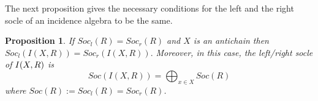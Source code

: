 \documentclass[12pt]{article}
\newtheorem{example}[theorem]{Example}
\newtheorem{proposition}[theorem]{Proposition}
\begin{document}





\medskip

The next proposition gives the necessary conditions for the
left and the right socle of an incidence algebra to be the same.

\begin{proposition}
\label{Socl=Socr} 
If $Soc_{l}(R)=Soc_{r}(R)$ and $X$ is an antichain then $Soc_{l}({I(X,R)}%
)=Soc_{r}({I(X,R)}).$ Moreover, in this case, the left/right socle of ${%
I(X,R)}$ is 
\begin{equation*}
Soc({I(X,R)})=\displaystyle\bigoplus_{x\in X}Soc(R)
\end{equation*}%
where $Soc(R):=Soc_{l}(R)=Soc_{r}(R)$.
\end{proposition}
\end{document}
